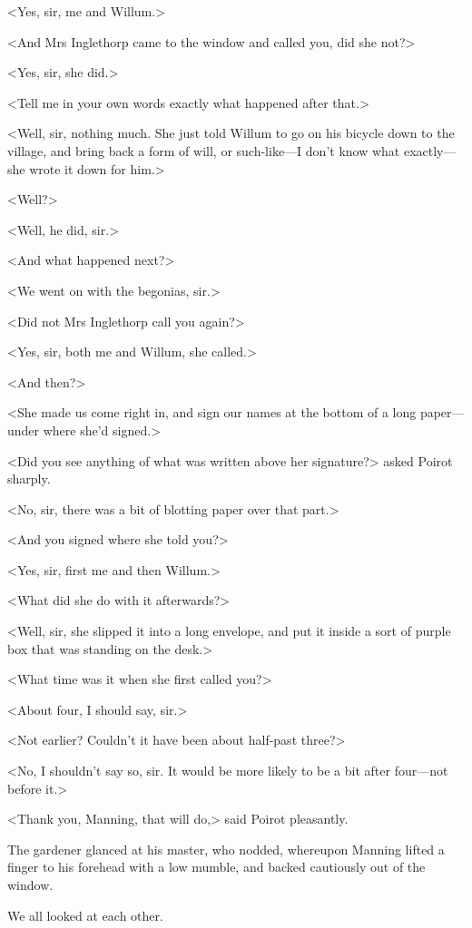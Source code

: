  <Yes, sir, me and Willum.> 

 <And Mrs Inglethorp came to the window and called you, did she not?> 

 <Yes, sir, she did.> 

 <Tell me in your own words exactly what happened after that.> 

 <Well, sir, nothing much. She just told Willum to go on his bicycle down to the village, and bring back a form of will, or such-like—I don't know what exactly—she wrote it down for him.> 

 <Well?> 

 <Well, he did, sir.> 

 <And what happened next?> 

 <We went on with the begonias, sir.> 

 <Did not Mrs Inglethorp call you again?> 

 <Yes, sir, both me and Willum, she called.> 

 <And then?> 

 <She made us come right in, and sign our names at the bottom of a long paper—under where she'd signed.> 

 <Did you see anything of what was written above her signature?> asked Poirot sharply. 

 <No, sir, there was a bit of blotting paper over that part.> 

 <And you signed where she told you?> 

 <Yes, sir, first me and then Willum.> 

 <What did she do with it afterwards?> 

 <Well, sir, she slipped it into a long envelope, and put it inside a sort of purple box that was standing on the desk.> 

 <What time was it when she first called you?> 

 <About four, I should say, sir.> 

 <Not earlier? Couldn't it have been about half-past three?> 

 <No, I shouldn't say so, sir. It would be more likely to be a bit after four—not before it.> 

 <Thank you, Manning, that will do,> said Poirot pleasantly. 

 The gardener glanced at his master, who nodded, whereupon Manning lifted a finger to his forehead with a low mumble, and backed cautiously out of the window. 

 We all looked at each other. 

